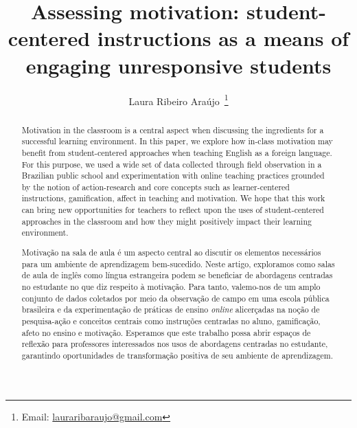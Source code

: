 \documentclass[english]{textolivre}
\title{Assessing motivation: student-centered instructions as a means of engaging unresponsive students}
\author[1]{Laura Ribeiro Araújo~\orcid{0000-0002-3539-0980}\thanks{Email: \href{mailto:lauraribaraujo@gmail.com}{lauraribaraujo@gmail.com}}}
\affil[1]{Universidade Federal de Minas Gerais, Faculdade de Letras, Programa de Pós-Graduação em Estudo Literários, Belo Horizonte, MG, Brasil.}
\begin{document}
\maketitle

\begin{polyabstract}
\begin{abstract}
Motivation in the classroom is a central aspect when discussing the ingredients for a successful learning environment. In this paper, we explore how in-class motivation may benefit from student-centered approaches when teaching English as a foreign language. For this purpose, we used a wide set of data collected through field observation in a Brazilian public school and experimentation with online teaching practices grounded by the notion of action-research and core concepts such as learner-centered instructions, gamification, affect in teaching and motivation. We hope that this work can bring new opportunities for teachers to reflect upon the uses of student-centered approaches in the classroom and how they might positively impact their learning environment.


\end{abstract}

\begin{portuguese}
\begin{abstract}
Motivação na sala de aula é um aspecto central ao discutir os elementos necessários para um ambiente de aprendizagem bem-sucedido. Neste artigo, exploramos como salas de aula de inglês como língua estrangeira podem se beneficiar de abordagens centradas no estudante no que diz respeito à motivação. Para tanto, valemo-nos de um amplo conjunto de dados coletados por meio da observação de campo em uma escola pública brasileira e da experimentação de práticas de ensino \textit{online} alicerçadas na noção de pesquisa-ação e conceitos centrais como instruções centradas no aluno, gamificação, afeto no ensino e motivação. Esperamos que este trabalho possa abrir espaços de reflexão para professores interessados nos usos de abordagens centradas no estudante, garantindo oportunidades de transformação positiva de seu ambiente de aprendizagem.

\end{abstract}
\end{portuguese}
\end{polyabstract}
\end{document}
